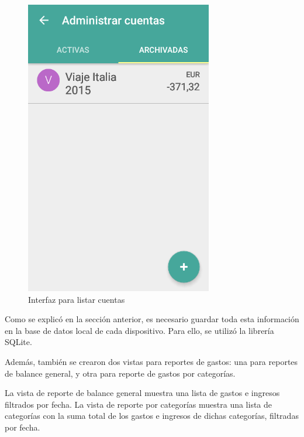 \begin{figure}[ht]
  \centering
  \includegraphics[scale=0.45,type=png,ext=.png,read=.png]{imagenes/archived_accounts}
  \caption{Interfaz para listar cuentas}
  \label{fig:interfazListarCuentasArchivadas}
\end{figure}

Como se explicó en la sección anterior, es necesario guardar toda esta información en la base de datos local de cada dispositivo. Para ello, se utilizó la librería SQLite.

Además, también se crearon dos vistas para reportes de gastos: una para reportes de balance general, y otra para reporte de gastos por categorías.

La vista de reporte de balance general muestra una lista de gastos e ingresos filtrados por fecha. La vista de reporte por categorías muestra una lista de categorías con la suma total de los gastos e ingresos de dichas categorías, filtradas por fecha.

